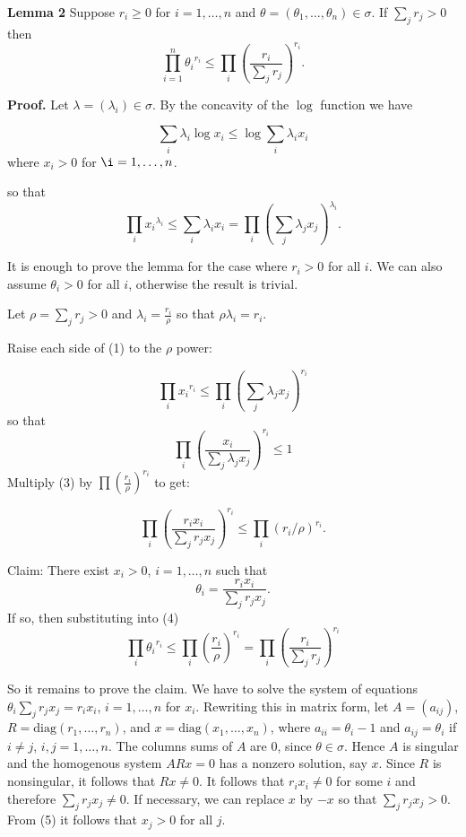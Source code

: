 \documentclass[12pt]{article}
\begin{document}
\textbf{Lemma 2} Suppose $r_i \ge 0$ for $i=1, \ldots, n$ and $\theta = (\theta_1, \ldots, \theta_n ) \in \sigma$. If $\sum_j r_j > 0$  then 
$$
\prod_{i=1}^{n} {\theta_i}^{r_i} \le \prod_i ( \frac{r_i}{\sum_j r_j})^{r_i}.
$$


\textbf{Proof.} Let $\lambda = (\lambda_i) \in \sigma$. By the concavity of the
$\log$ function we have

$$
\sum_i \lambda_i \log x_i \le \log \sum_i \lambda_i x_i 
$$ 
where $x_i > 0$ for $\i=1, \ldots, n$.

so that 
\begin{equation}
\prod_i {x_i}^{\lambda_i} \le \sum_i \lambda_i x_i = \prod_i ( \sum_j \lambda_j x_j )^{\lambda_i} .
\end{equation} 

It is enough to prove the lemma for the case where $r_i>0$ for all $i$.
We can also assume $\theta_i > 0$ for all $i$, otherwise the result is trivial.

Let $\rho = \sum_j r_j > 0$ and $\lambda_i = \frac{r_i}{\rho}$ so that
$\rho \lambda_i = r_i$. 

Raise each side of (1) to the $\rho$ power:

\begin{equation}
\prod_i {x_i}^{r_i} \le \prod_i (\sum_j \lambda_j x_j )^{r_i} 
\end{equation}
so that
\begin{equation}
\prod_i (\frac{x_i}{\sum_j \lambda_j x_j })^{r_i} \le 1 
\end{equation}
Multiply (3) by $\prod (\frac{r_i}{\rho})^{r_i}$ to get:

\begin{equation}
\prod_i ( \frac{r_i x_i}{\sum_j r_j x_j})^{r_i} \le \prod_i (r_i/\rho)^{r_i}.
\end{equation}

Claim: There exist $x_i>0 $, $i=1,\ldots, n$ such that
\begin{equation}
\theta_i = \frac{r_i x_i}{\sum_j r_j x_j}.
\end{equation}
 If so, then substituting into (4)
$$
\prod_i {\theta_i}^{r_i} \le \prod_i ( \frac{r_i}{\rho})^{r_i} = \prod_i (\frac{r_i}{\sum_j r_j})^{r_i}
$$

So it remains to prove the claim. We have to solve the system of equations
$\theta_i \sum_j r_j x_j = r_i x_i$, $i=1, \ldots, n$ for $x_i$. 
Rewriting this in matrix form, let $A=(a_{ij})$,  $R=\textrm{diag}(r_1, \ldots, r_n)$,
and $x=\textrm{diag}(x_1, \ldots, x_n)$, 
where $a_{ii} = \theta_i-1$ and $a_{ij} = \theta_i$ if $i \not = j$,  $i,j=1,\ldots, n$.
The columns sums of $A$ are $0$, since 
$\theta \in \sigma$. Hence $A$ is singular and  the homogenous system $ARx=0$
has a nonzero solution, say $x$. Since $R$ is nonsingular, it follows that
$Rx \not = 0$. It follows that $r_i x_i \not = 0$ for some $i$ and therefore
$\sum_j r_j x_j \not = 0$. If necessary, we can replace $x$ by $-x$ so that
$\sum_j r_j x_j >0$. From (5) it follows that $x_j >0$ for all $j$.
\end{document}
